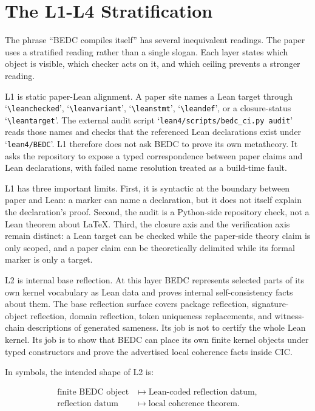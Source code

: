 \section{The L1-L4 Stratification}\label{sec:self-comp-stratification}

The phrase ``BEDC compiles itself'' has several inequivalent readings. The
paper uses a stratified reading rather than a single slogan. Each layer states
which object is visible, which checker acts on it, and which ceiling prevents a
stronger reading.

L1 is static paper-Lean alignment. A paper site names a Lean target through
`\verb|\leanchecked|', `\verb|\leanvariant|', `\verb|\leanstmt|',
`\verb|\leandef|', or a closure-status `\verb|\leantarget|'. The external audit
script `\verb|lean4/scripts/bedc_ci.py audit|' reads those names and checks that
the referenced Lean declarations exist under `\verb|lean4/BEDC|'. L1 therefore
does not ask BEDC to prove its own metatheory. It asks the repository to expose a
typed correspondence between paper claims and Lean declarations, with failed
name resolution treated as a build-time fault.

L1 has three important limits. First, it is syntactic at the boundary between
paper and Lean: a marker can name a declaration, but it does not itself explain
the declaration's proof. Second, the audit is a Python-side repository check,
not a Lean theorem about LaTeX. Third, the closure axis and the verification axis
remain distinct: a Lean target can be checked while the paper-side theory claim
is only scoped, and a paper claim can be theoretically delimited while its
formal marker is only a target.

L2 is internal base reflection. At this layer BEDC represents selected parts of
its own kernel vocabulary as Lean data and proves internal self-consistency
facts about them. The base reflection surface covers package reflection,
signature-object reflection, domain reflection, token uniqueness replacements,
and witness-chain descriptions of generated sameness. Its job is not to certify
the whole Lean kernel. Its job is to show that BEDC can place its own finite
kernel objects under typed constructors and prove the advertised local
coherence facts inside CIC.

In symbols, the intended shape of L2 is:

$$
\begin{aligned}
\text{finite BEDC object}
&\longmapsto \text{Lean-coded reflection datum},\\
\text{reflection datum}
&\longmapsto \text{local coherence theorem}.
\end{aligned}
$$

